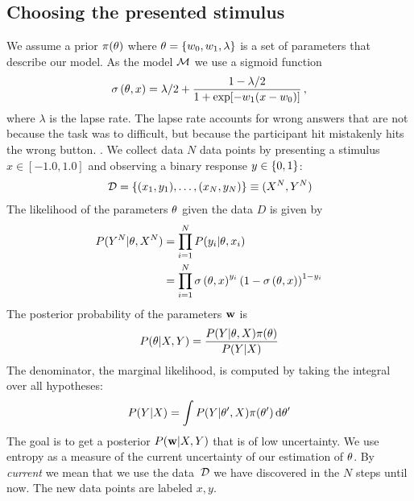 \subsection{Choosing the presented stimulus} %
\label{sub:choosing_the_presented_stimulus}
We assume a prior ${\pi(\theta)}$ where $\theta  = \left\{ w_0, w_1, \lambda \right\}$ is a set of parameters that describe our model.
As the model $\mathcal{M}$ we use a sigmoid function
\begin{align}
	{\sigma \left(\theta, x\right)} = \lambda / 2 + \frac{1-\lambda / 2}{1 + \exp[-w_1(x - w_0)]} \,,
\end{align}
where $\lambda$ is the lapse rate. The lapse rate accounts for wrong answers that are not because the task was to difficult, but because the participant hit mistakenly hits the wrong button.
.
We collect data $N$ data points by presenting a stimulus $x \in [-1.0, 1.0]$ and observing a binary response $y \in \left\{ 0, 1 \right\}$:
\begin{align}
	 \,\mathcal{D} = \left\{ (x_1, y_1), \dots, (x_N, y_N) \right\} \equiv (X^N, Y^N)
\end{align}
The likelihood of the parameters $\theta$ given the data $D$ is given by
\begin{align}
	{P(Y^N | \theta, X^N)}
	&= \prod_{i=1}^N {P(y_i | \theta, x_i)} \\
	&= \prod_{i=1}^N {\sigma \left(\theta, x\right)}^{y_i}
		\left( 1 - {\sigma \left(\theta, x\right)} \right)^{1-y_i}
\end{align}
The posterior probability of the parameters ${\bf w}$ is
\begin{align}
	{P(\theta| X, Y)} = \frac{{P(Y | \theta, X)} {\pi(\theta)}}{{P(Y | X)}}
\end{align}
The denominator, \ie the marginal likelihood, is computed by taking the integral over all hypotheses:
\begin{align}
	{P(Y | X)} = \int {P(Y | \theta', X)} {\pi(\theta')} \,\mathrm{d} \theta'
\end{align}
The goal is to get a posterior ${P({\bf w} | X, Y)}$ that is of low uncertainty. We use entropy as a measure of the current uncertainty of our estimation of $\theta$. By \emph{current} we mean that we use the data $\,\mathcal{D}$ we have discovered in the $N$ steps until now. The new data points are labeled $x, y$.
